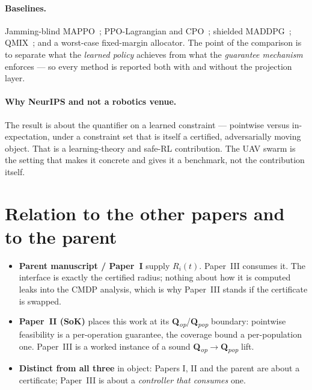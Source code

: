 \documentclass[11pt,a4paper]{article}
\newcommand{\Ri}{R_i}
\newcommand{\Qlvl}[1]{\textbf{Q}\textsubscript{\textit{#1}}}
\newcommand{\Qop}{\Qlvl{op}}
\newcommand{\Qpop}{\Qlvl{pop}}
\begin{document}
\paragraph{Baselines.} Jamming-blind MAPPO~\cite{yu2022mappo}; PPO-Lagrangian
and CPO~\cite{achiam2017cpo}; shielded MADDPG~\cite{lowe2017maddpg,alshiekh2018shielding};
QMIX~\cite{rashid2018qmix}; and a worst-case fixed-margin allocator. The point of
the comparison is to separate what the \emph{learned policy} achieves from what
the \emph{guarantee mechanism} enforces --- so every method is reported both with
and without the projection layer.

\paragraph{Why NeurIPS and not a robotics venue.} The result is about the
quantifier on a learned constraint --- pointwise versus in-expectation, under a
constraint set that is itself a certified, adversarially moving object. That is a
learning-theory and safe-RL contribution. The UAV swarm is the setting that makes
it concrete and gives it a benchmark, not the contribution itself.

\section{Relation to the other papers and to the parent}
\begin{itemize}
\item \textbf{Parent manuscript / Paper~I} supply $\Ri(t)$. Paper~III consumes it.
  The interface is exactly the certified radius; nothing about how it is computed
  leaks into the CMDP analysis, which is why Paper~III stands if the certificate
  is swapped.
\item \textbf{Paper~II (SoK)} places this work at its \Qop{}/\Qpop{} boundary:
  pointwise feasibility is a per-operation guarantee, the coverage bound a
  per-population one. Paper~III is a worked instance of a sound \Qop$\to$\Qpop{}
  lift.
\item \textbf{Distinct from all three} in object: Papers I, II and the parent are
  about a certificate; Paper~III is about a \emph{controller that consumes}
  one.
\end{itemize}

\end{document}
